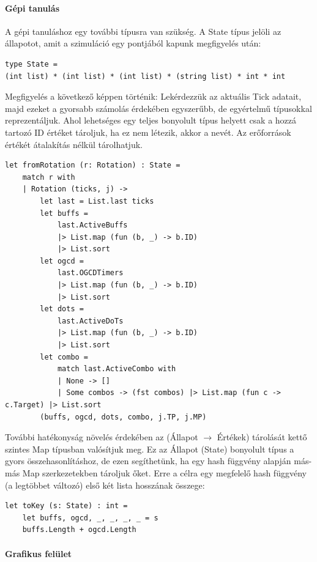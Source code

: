 \documentclass[12pt]{article}
\begin{document}
\paragraph{Gépi tanulás}

A gépi tanuláshoz egy további típusra van szükség. A State típus jelöli az állapotot, amit a szimuláció egy pontjából kapunk megfigyelés után:

\begin{lstlisting}
type State = 
(int list) * (int list) * (int list) * (string list) * int * int
\end{lstlisting}

Megfigyelés a következő képpen történik: Lekérdezzük az aktuális Tick adatait, majd ezeket a gyorsabb számolás érdekében egyszerűbb, de egyértelmű típusokkal reprezentáljuk.
Ahol lehetséges egy teljes bonyolult típus helyett csak a hozzá tartozó ID értéket tároljuk, ha ez nem létezik, akkor a nevét. Az erőforrások értékét átalakítás nélkül tárolhatjuk.

\begin{lstlisting}
let fromRotation (r: Rotation) : State =
	match r with
	| Rotation (ticks, j) ->
		let last = List.last ticks
		let buffs =
			last.ActiveBuffs
			|> List.map (fun (b, _) -> b.ID)
			|> List.sort
		let ogcd =
			last.OGCDTimers
			|> List.map (fun (b, _) -> b.ID)
			|> List.sort
		let dots =
			last.ActiveDoTs
			|> List.map (fun (b, _) -> b.ID)
			|> List.sort
		let combo =
			match last.ActiveCombo with
			| None -> []
			| Some combos -> (fst combos) |> List.map (fun c -> c.Target) |> List.sort
		(buffs, ogcd, dots, combo, j.TP, j.MP)
\end{lstlisting}

További hatékonyság növelés érdekében az (Állapot $\rightarrow$ Értékek) tárolását kettő szintes Map típusban valósítjuk meg.
Ez az Állapot (State) bonyolult típus a gyors összehasonlításhoz, de ezen segíthetünk, ha egy hash függvény alapján más-más Map szerkezetekben tároljuk őket. 
Erre a célra egy megfelelő hash függvény (a legtöbbet változó) első két lista hosszának összege:

\begin{lstlisting}
let toKey (s: State) : int =
	let buffs, ogcd, _, _, _, _ = s
	buffs.Length + ogcd.Length
\end{lstlisting}

\paragraph{Grafikus felület}
\end{document}
